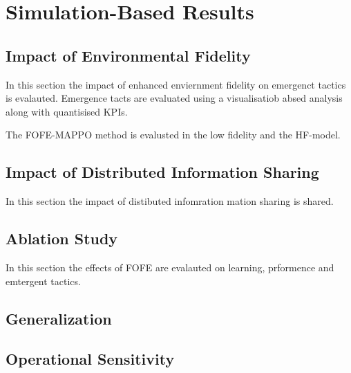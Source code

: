 \chapter{Simulation-Based Results}


\section{Impact of Environmental Fidelity}
In this section the impact of enhanced enviernment fidelity on emergenct tactics is evalauted. Emergence tacts are evaluated using a visualisatiob absed analysis along with quantisised KPIs. 

The FOFE-MAPPO method is evalusted in the low fidelity and the HF-model. 


\section{Impact of Distributed Information Sharing}

In this section the impact of distibuted infomration mation sharing is shared. 


\section{Ablation Study}
In this section the effects of FOFE are evalauted on learning, prformence and emtergent tactics. 


\section{Generalization}


\section{Operational Sensitivity}


